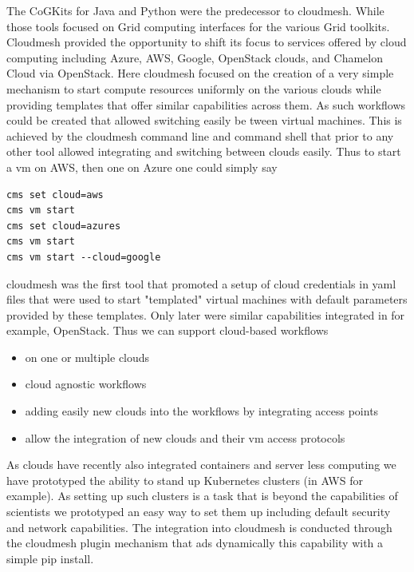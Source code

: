 \documentclass[utf8]{FrontiersinVancouver} %
\begin{document}
The CoGKits for Java and Python were the predecessor to cloudmesh. While those tools focused on Grid computing interfaces for the various Grid toolkits. Cloudmesh provided the opportunity to shift its focus to services offered by cloud computing including Azure, AWS, Google, OpenStack clouds, and Chamelon Cloud via OpenStack. Here cloudmesh focused on the creation of a very simple mechanism to start compute resources uniformly on the various clouds while providing templates that offer similar capabilities across them. As such workflows could be created that allowed switching easily be tween virtual machines. This is achieved by the cloudmesh command line and command shell that prior to any other tool allowed integrating and switching between clouds easily. Thus to start a vm on AWS, then one on Azure one could simply say

\begin{verbatim}
cms set cloud=aws
cms vm start
cms set cloud=azures
cms vm start
cms vm start --cloud=google
\end{verbatim}

cloudmesh was the first tool that promoted a setup of cloud credentials in yaml files that were used to start "templated" virtual machines with default parameters provided by these templates. Only later were similar capabilities integrated in for example,  OpenStack. Thus we can support cloud-based workflows

\begin{itemize}
    \item on one or multiple clouds
    \item cloud agnostic workflows
    \item adding easily new clouds into the workflows by integrating access points
    \item allow the integration of new clouds and their vm access protocols
\end{itemize}

As clouds have recently also integrated containers and server less computing we have prototyped the ability to stand up Kubernetes clusters (in AWS for example). As setting up such clusters is a task that is beyond the capabilities of scientists we prototyped an easy way to set them up including default security and network capabilities. The integration into cloudmesh is conducted through the cloudmesh plugin mechanism that ads dynamically this capability with a simple pip install.
\end{document}
